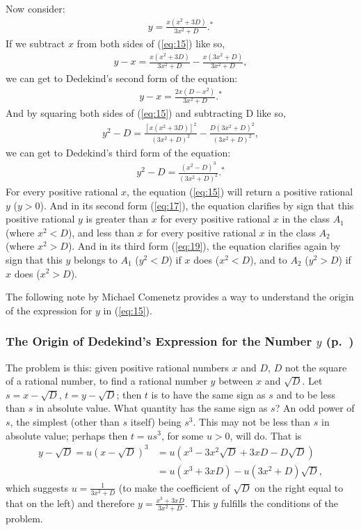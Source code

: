 \documentclass[polutonikogreek,english,twoside,openright]{article}
\begin{document}
Now consider:
\begin{align}
  \label{eq:15}
  y=\frac{x(x^2+3D)}{3x^2+D}.^*
\end{align}
If we subtract $x$ from both sides of (\ref{eq:15}) like so,
\begin{align}
  \label{eq:16}
  y-x=\frac{x(x^2+3D)}{3x^2+D}-\frac{x(3x^2+D)}{3x^2+D},
\end{align}
we can get to Dedekind's second form of the equation:
\begin{align}
  \label{eq:17}
  y-x=\frac{2x(D-x^2)}{3x^2+D}.^*
\end{align}
And by squaring both sides of (\ref{eq:15})
and subtracting D like so,
\begin{align}
  \label{eq:18}
  y^2-D=\frac{[x(x^2+3D)]^2}{(3x^2+D)^2}-\frac{D(3x^2+D)^2}{(3x^2+D)^2},
\end{align}
we can get to Dedekind's third form of the equation:
\begin{align}
  \label{eq:19}
  y^2-D=\frac{(x^2-D)^3}{(3x^2+D)^2}.^*
\end{align}
For every positive rational $x$, the equation (\ref{eq:15}) will
return a positive rational $y$ ($y>0$). And in its second form
(\ref{eq:17}), the equation clarifies by sign that this positive
rational $y$ is greater than $x$ for every positive rational $x$ in
the class $A_1$ (where $x^2<D$), and less than $x$ for every positive
rational $x$ in the class $A_2$ (where $x^2>D$). And in its third form
(\ref{eq:19}), the equation clarifies again by sign that this $y$
belongs to $A_1$ ($y^2<D$) if $x$ does ($x^2<D$), and to $A_2$
($y^2>D$) if $x$ does ($x^2>D$).

\medskip{}

\noindent The following note by Michael Comenetz provides a way to
understand the origin of the expression for $y$ in (\ref{eq:15}).

\subsubsection*{The Origin of Dedekind's Expression for the Number $y$ (p.\ \pageref{ypage})}

The problem is this: given positive rational numbers $x$ and $D$, $D$
not the square of a rational number, to find a rational number $y$
between $x$ and $\sqrt{D}$. Let $s=x-\sqrt{D}$, $t=y-\sqrt{D}$; then
$t$ is to have the same sign as $s$ and to be less than $s$ in
absolute value. What quantity has the same sign as $s$? An odd power
of $s$, the simplest (other than $s$ itself) being $s^3$. This may not
be less than $s$ in absolute value; perhaps then $t=us^3$, for some
$u>0$, will do. That is
\begin{align*}
  y-\sqrt{D}=u(x-\sqrt{D})^3&=u(x^3-3x^2\sqrt{D}+3xD-D\sqrt{D})\\
                            &=u(x^3+3xD)-u(3x^2+D)\sqrt{D},
\end{align*}
which suggests $u=\frac{1}{3x^2+D}$ (to make the coefficient of
$\sqrt{D}$ on the right equal to that on the left) and therefore
$y=\frac{x^3+3xD}{3x^2+D}$. This $y$ fulfills the conditions of the
problem.
\end{document}
